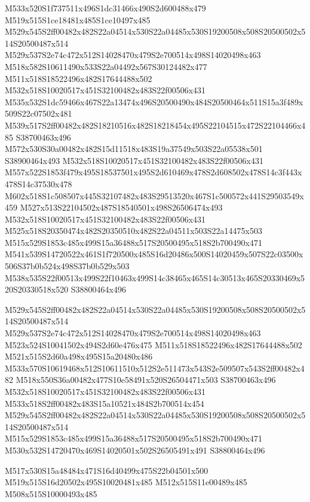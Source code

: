 \documentclass{article}
\begin{document}
\begin{multicols}{2}
M533x520S1f737511x496S1dc31466x490S2d600488x479 M519x515S1ce18481x485S1ce10497x485 M529x545S2ff00482x482S22a04514x530S22a04485x530S19200508x508S20500502x514S20500487x514 M529x537S2e74c472x512S14028470x479S2e700514x498S14020498x463 M518x582S10611490x533S22a04492x567S30124482x477 M511x518S18522496x482S17644488x502 M532x518S10020517x451S32100482x483S22f00506x431 M535x532S1dc59466x467S22a13474x496S20500490x484S20500464x511S15a3f489x509S22c07502x481 M539x517S2ff00482x482S18210516x482S18218454x495S22104515x472S22104466x485 S38700463x496 M572x530S30a00482x482S15d11518x483S19a37549x503S22a05538x501 S38900464x493 M532x518S10020517x451S32100482x483S22f00506x431 M557x522S1853f479x495S18537501x495S2d610469x478S2d608502x478S14c3f443x478S14c37530x478 M602x518S1c508507x445S32107482x483S29513520x467S1c500572x441S29503549x459 M527x513S22104502x487S18540501x498S26506474x493 M532x518S10020517x451S32100482x483S22f00506x431 M525x518S20350474x482S20350510x482S22a04511x503S22a14475x503 M515x529S1853c485x499S15a36488x517S20500495x518S2b700490x471 M541x539S14720522x461S1f720500x485S16d20486x500S14020459x507S22c03500x506S37b0b524x498S37b0b529x503 M538x535S22f00513x499S22f10463x499S14c38465x465S14c30513x465S20330469x520S20330518x520 S38800464x496

M529x545S2ff00482x482S22a04514x530S22a04485x530S19200508x508S20500502x514S20500487x514 M529x537S2e74c472x512S14028470x479S2e700514x498S14020498x463 M523x524S10041502x494S2d60e476x475 M511x518S18522496x482S17644488x502 M521x515S2d60a498x495S15a20480x486 M533x570S10619468x512S10611510x512S2e511473x543S2e509507x543S2ff00482x482 M518x550S36a00482x477S10e58491x520S26504471x503 S38700463x496 M532x518S10020517x451S32100482x483S22f00506x431 M533x518S2ff00482x483S15a10521x484S2b700514x454 M529x545S2ff00482x482S22a04514x530S22a04485x530S19200508x508S20500502x514S20500487x514 M515x529S1853c485x499S15a36488x517S20500495x518S2b700490x471 M530x532S14720470x469S14020501x502S26505491x491 S38800464x496

\begin{center}
M517x530S15a48484x471S16d40499x475S22b04501x500 M519x515S16d20502x495S10020481x485 M512x515S11e00489x485 M508x515S10000493x485 
\end{center}




\end{multicols}
\end{document}
